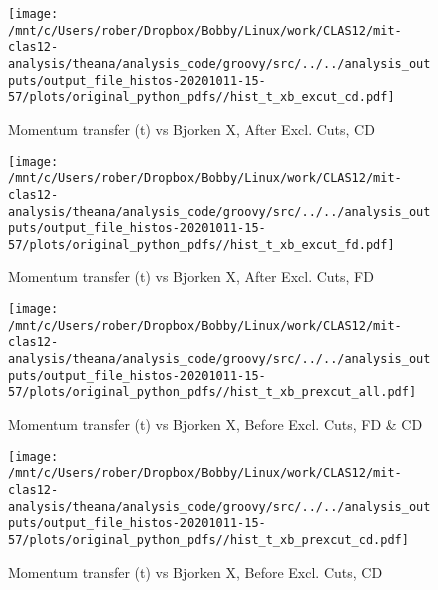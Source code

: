 \documentclass{article}
\begin{document}
\begin{landscape}
    \begin{figure}[h]
        \centering

        \texttt{[image: /mnt/c/Users/rober/Dropbox/Bobby/Linux/work/CLAS12/mit-clas12-analysis/theana/analysis\_code/groovy/src/../../analysis\_outputs/output\_file\_histos-20201011-15-57/plots/original\_python\_pdfs//hist\_t\_xb\_excut\_cd.pdf]}
        \captionsetup{textformat=empty,labelformat=blank}
        \caption{Momentum transfer (t) vs Bjorken X, After Excl. Cuts, CD}
    \end{figure}
    \clearpage
    
    \begin{figure}[h]
        \centering

        \texttt{[image: /mnt/c/Users/rober/Dropbox/Bobby/Linux/work/CLAS12/mit-clas12-analysis/theana/analysis\_code/groovy/src/../../analysis\_outputs/output\_file\_histos-20201011-15-57/plots/original\_python\_pdfs//hist\_t\_xb\_excut\_fd.pdf]}
        \captionsetup{textformat=empty,labelformat=blank}
        \caption{Momentum transfer (t) vs Bjorken X, After Excl. Cuts, FD}
    \end{figure}
    \clearpage
    
    \begin{figure}[h]
        \centering

        \texttt{[image: /mnt/c/Users/rober/Dropbox/Bobby/Linux/work/CLAS12/mit-clas12-analysis/theana/analysis\_code/groovy/src/../../analysis\_outputs/output\_file\_histos-20201011-15-57/plots/original\_python\_pdfs//hist\_t\_xb\_prexcut\_all.pdf]}
        \captionsetup{textformat=empty,labelformat=blank}
        \caption{Momentum transfer (t) vs Bjorken X, Before Excl. Cuts, FD \& CD}
    \end{figure}
    \clearpage
    
    \begin{figure}[h]
        \centering

        \texttt{[image: /mnt/c/Users/rober/Dropbox/Bobby/Linux/work/CLAS12/mit-clas12-analysis/theana/analysis\_code/groovy/src/../../analysis\_outputs/output\_file\_histos-20201011-15-57/plots/original\_python\_pdfs//hist\_t\_xb\_prexcut\_cd.pdf]}
        \captionsetup{textformat=empty,labelformat=blank}
        \caption{Momentum transfer (t) vs Bjorken X, Before Excl. Cuts, CD}
    \end{figure}
    \clearpage
    
    \begin{figure}[h]
        \centering


\end{figure}
\end{landscape}
\end{document}
